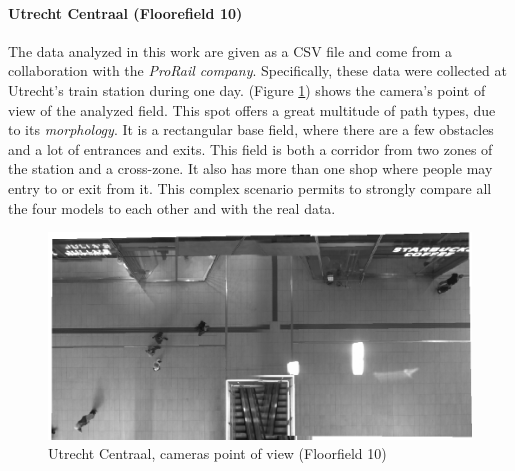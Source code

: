 \documentclass[class=article, crop=false]{standalone}
\begin{document}



\paragraph{Utrecht Centraal (Floorefield 10)}
The data analyzed in this work are given as a CSV file and come from a collaboration with the \emph{ProRail company}.
Specifically, these data were collected at Utrecht’s train station during one day.
(Figure \ref{fig:trainf10}) shows the camera’s point of view of the analyzed field.
This spot offers a great multitude of path types, due to its \emph{morphology}. 
It is a rectangular base field, where there are a few obstacles and a lot of entrances and exits.
This field is both a corridor from two zones of the station and a cross-zone. 
It also has more than one shop where people may entry to or exit from it.
This complex scenario permits to strongly compare all the four models to each other and with the real data.

\begin{figure}[h]
\centering
\includegraphics[width=0.4\textheight]{imgs/bg10.png}
\caption{Utrecht Centraal, cameras point of view (Floorfield 10)}
\label{fig:trainf10}
\end{figure}
\end{document}
